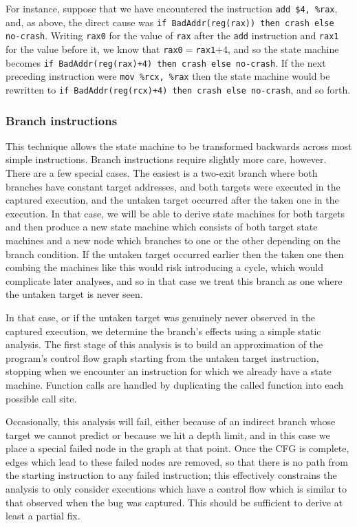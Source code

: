 \documentclass[10pt,twocolumn,preprint,natbib,authoryear]{sigplanconf}
\begin{document}
For instance, suppose that we have encountered the instruction
\verb|add $4, %rax|, and, as above, the direct cause was
\verb|if BadAddr(reg(rax)) then crash else no-crash|.  Writing
\verb|rax0| for the value of \verb|rax| after the \verb|add|
instruction and \verb|rax1| for the value before it, we know that
\verb|rax0|$=$\verb|rax1|$+4$, and so the state machine becomes
\verb|if BadAddr(reg(rax)+4) then crash else no-crash|.  If the next
preceding instruction were \verb|mov %rcx, %rax| then the state
machine would be rewritten to
\verb|if BadAddr(reg(rcx)+4) then crash else no-crash|, and so forth.

\subsubsection{Branch instructions}
This technique allows the state machine to be transformed backwards
across most simple instructions.  Branch instructions require slightly
more care, however.  There are a few special cases.  The easiest is a
two-exit branch where both branches have constant target addresses,
and both targets were executed in the captured execution, and the
untaken target occurred after the taken one in the execution.  In that
case, we will be able to derive state machines for both targets and
then produce a new state machine which consists of both target state
machines and a new node which branches to one or the other depending
on the branch condition.  If the untaken target occurred earlier then
the taken one then combing the machines like this would risk
introducing a cycle, which would complicate later analyses, and so in
that case we treat this branch as one where the untaken target is
never seen.

In that case, or if the untaken target was genuinely never observed in
the captured execution, we determine the branch's effects using a
simple static analysis.  The first stage of this analysis is to build
an approximation of the program's control flow graph starting from the
untaken target instruction, stopping when we encounter an instruction
for which we already have a state machine.  Function calls are handled
by duplicating the called function into each possible call site.

Occasionally, this analysis will fail, either because of an indirect
branch whose target we cannot predict or because we hit a depth limit,
and in this case we place a special failed node in the graph at that
point.  Once the CFG is complete, edges which lead to these failed
nodes are removed, so that there is no path from the starting
instruction to any failed instruction; this effectively constrains the
analysis to only consider executions which have a control flow which
is similar to that observed when the bug was captured.  This should be
sufficient to derive at least a partial fix.
\end{document}
